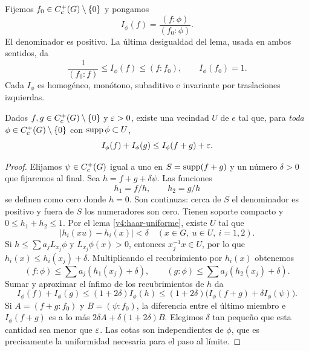 Fijemos $f_0\in C_c^+(G)\setminus\{0\}$ y pongamos
\[
 I_\phi(f)=\frac{(f:\phi)}{(f_0:\phi)}.
\]
El denominador es positivo. La última desigualdad del lema, usada en ambos sentidos, da
\[
 \frac1{(f_0:f)}\leq I_\phi(f)\leq(f:f_0),\qquad I_\phi(f_0)=1.       \tag{10.2}\label{v4:haar-cotas}
\]
Cada $I_\phi$ es homogéneo, monótono, subaditivo e invariante por traslaciones izquierdas.

\begin{lema}\label{v4:haar-casiaditivo}
Dados $f,g\in C_c^+(G)\setminus\{0\}$ y $\varepsilon>0$, existe una vecindad $U$ de $e$ tal que, para \emph{toda} $\phi\in C_c^+(G)\setminus\{0\}$ con $\operatorname{supp}\phi\subset U$,
\[
 I_\phi(f)+I_\phi(g)\leq I_\phi(f+g)+\varepsilon.
\]
\end{lema}
\begin{proof}
Elijamos $\psi\in C_c^+(G)$ igual a uno en $S=\operatorname{supp}(f+g)$ y un número $\delta>0$ que fijaremos al final. Sea $h=f+g+\delta\psi$. Las funciones
\[
 h_1=f/h,\qquad h_2=g/h
\]
se definen como cero donde $h=0$. Son continuas: cerca de $S$ el denominador es positivo y fuera de $S$ los numeradores son cero. Tienen soporte compacto y $0\leq h_1+h_2\leq1$. Por el lema \ref{v4:haar-uniforme}, existe $U$ tal que
\[
 |h_i(xu)-h_i(x)|<\delta\quad(x\in G,\ u\in U,\ i=1,2).
\]
Si $h\leq\sum a_jL_{x_j}\phi$ y $L_{x_j}\phi(x)>0$, entonces $x_j^{-1}x\in U$, por lo que $h_i(x)\leq h_i(x_j)+\delta$. Multiplicando el recubrimiento por $h_i(x)$ obtenemos
\[
 (f:\phi)\leq\sum a_j(h_1(x_j)+\delta),\qquad
 (g:\phi)\leq\sum a_j(h_2(x_j)+\delta).
\]
Sumar y aproximar el ínfimo de los recubrimientos de $h$ da
\[
 I_\phi(f)+I_\phi(g)\leq(1+2\delta)I_\phi(h)
 \leq(1+2\delta)\bigl(I_\phi(f+g)+\delta I_\phi(\psi)\bigr).
\]
Si $A=(f+g:f_0)$ y $B=(\psi:f_0)$, la diferencia entre el último miembro e $I_\phi(f+g)$ es a lo más
$2\delta A+\delta(1+2\delta)B$. Elegimos $\delta$ tan pequeño que esta cantidad sea menor que $\varepsilon$. Las cotas son independientes de $\phi$, que es precisamente la uniformidad necesaria para el paso al límite.
\end{proof}

